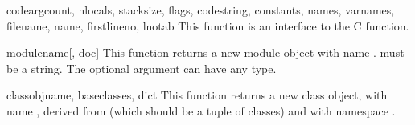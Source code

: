 \begin{funcdesc}{code}{argcount, nlocals, stacksize, flags, codestring,
                       constants, names, varnames, filename, name, firstlineno,
                       lnotab}
This function is an interface to the  C
function.
\end{funcdesc}

\begin{funcdesc}{module}{name[, doc]}
This function returns a new module object with name .
 must be a string.
The optional  argument can have any type.
\end{funcdesc}

\begin{funcdesc}{classobj}{name, baseclasses, dict}
This function returns a new class object, with name , derived
from  (which should be a tuple of classes) and with
namespace .
\end{funcdesc}

